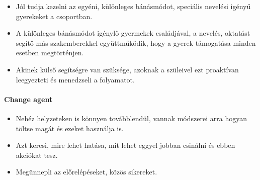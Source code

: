 \begin{itemize}

  \item
        Jól tudja kezelni az egyéni, különleges bánásmódot, speciális nevelési
        igényű gyerekeket a csoportban.
  \item A különleges bánásmódot igénylő gyermekek családjával, a nevelés,
        oktatást segítő más szakemberekkel
        együttműködik, hogy a gyerek támogatása minden esetben megtörténjen.
  \item
        Akinek külső segítségre van szüksége, azoknak a szüleivel ezt
        proaktívan leegyezteti és menedzseli a folyamatot.
\end{itemize}

\paragraph{Change agent}\label{change-agent}

\begin{itemize}

  \item
        Nehéz helyzeteken is könnyen továbblendül, vannak módszerei arra
        hogyan töltse magát és ezeket használja is.
  \item
        Azt keresi, mire lehet hatása, mit lehet eggyel jobban csinálni és
        ebben akciókat tesz.
  \item
        Megünnepli az előrelépéseket, közös sikereket.
\end{itemize}
